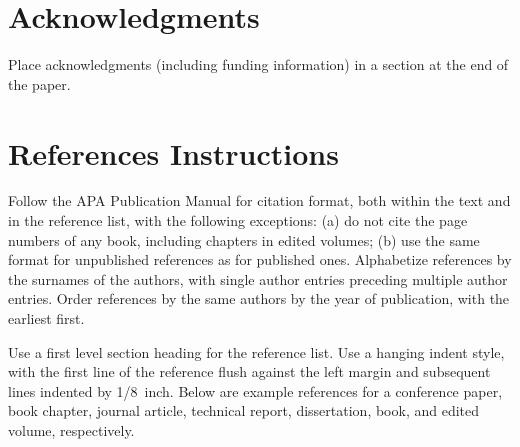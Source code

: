 \documentclass[10pt,letterpaper]{article}
\begin{document}
\section{Acknowledgments}

Place acknowledgments (including funding information) in a section at
the end of the paper.


\section{References Instructions}

Follow the APA Publication Manual for citation format, both within the
text and in the reference list, with the following exceptions: (a) do
not cite the page numbers of any book, including chapters in edited
volumes; (b) use the same format for unpublished references as for
published ones. Alphabetize references by the surnames of the authors,
with single author entries preceding multiple author entries. Order
references by the same authors by the year of publication, with the
earliest first.

Use a first level section heading for the reference list. Use a
hanging indent style, with the first line of the reference flush
against the left margin and subsequent lines indented by 1/8~inch.
Below are example references for a conference paper, book chapter,
journal article, technical report, dissertation, book, and edited
volume, respectively.

\nocite{ChalnickBillman1988a}
\nocite{Feigenbaum1963a}
\nocite{Hill1983a}
\nocite{OhlssonLangley1985a}
\nocite{Lewis1978a}
\nocite{NewellSimon1972a}
\nocite{ShragerLangley1990a}




\setlength{\bibleftmargin}{.125in}
\setlength{\bibindent}{-\bibleftmargin}


\end{document}

